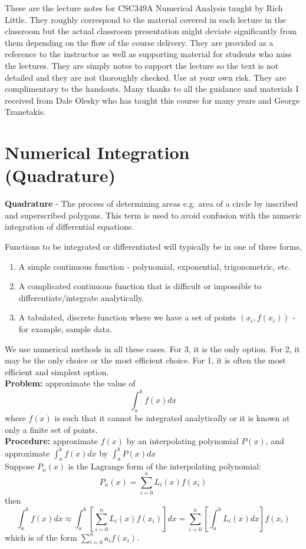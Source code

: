 \documentclass [titlepage,12pt,letter] {article}
\begin{document}
 


These are the lecture notes for CSC349A Numerical Analysis taught by
Rich Little. They roughly correspond to
the material covered in each lecture in the classroom but the actual
classroom presentation might deviate significantly from them depending
on the flow of the course delivery. They are provided as a reference to
the instructor as well as supporting material for students who miss
the lectures. They are simply notes to support the lecture so the text
is not detailed and they are not thoroughly checked. Use at your own
risk. They are complimentary to the handouts. Many thanks to all the
guidance and materials I received from Dale Olesky who has taught this
course for many years and George Tzanetakis. 


\section{Numerical Integration (Quadrature)} 

{\bf Quadrature} - The process of determining areas e.g. area of a circle by inscribed
and superscribed polygons. This term is used to avoid confusion with
the numeric integration of differential equations.

Functions to be integrated or differentiated will typically be in one of three forms,

\begin{enumerate}
\item A simple continuous function - polynomial, exponential, trigonometric, etc.
\item A complicated continuous function that is difficult or impossible to differentiate/integrate analytically.
\item A tabulated, discrete function where we have a set of points $(x_i,f(x_i))$ - for example, sample data.
\end{enumerate}

We use numerical methods in all these cases. For 3, it is the only option. For 2, it may be the only choice or the most efficient choice. For 1, it is often the most efficient and simplest option. \\

\noindent 
{\bf Problem:} approximate the value of 
\[
\int_a^{b} f(x) dx
\] 
\noindent 
where $f(x)$ is such that it cannot be integrated analytically or it is known at only a finite set of points. 
\\
\noindent 
{\bf Procedure:} approximate $f(x)$ by an interpolating polynomial $P(x)$, and approximate $\int_{a}^{b} f(x)dx$ by $\int_a^{b} P(x)dx$
\\
Suppose $P_n(x)$ is the Lagrange form of the interpolating polynomial: 
\[
P_n(x) = \sum_{i=0}^{n} L_i(x) f(x_i)
\]
\noindent 
then 
\[
\int_{a}^{b} f(x)dx \approx \int_{a}^{b} \left [ \sum_{i=0}^{n} L_i(x) f(x_i) \right ] dx = \sum_{i=0}^{n} \left[ \int_a^b L_i(x) dx \right ] f(x_i) 
\]
\noindent 
which is of the form $\sum_{i=0}^{n} a_i f(x_i)$. 
\end{document}
